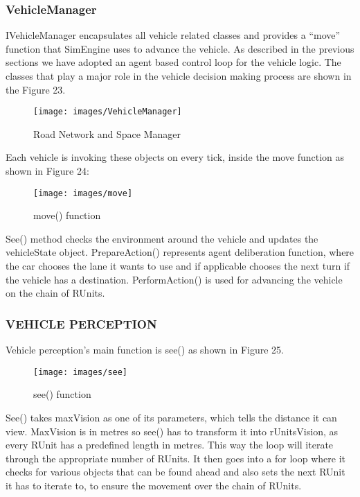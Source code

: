 \documentclass[11pt,a4paper]{article}
\begin{document}
  \subsubsection{VehicleManager}
  
  IVehicleManager encapsulates all vehicle related classes and provides a “move” function that SimEngine uses to advance the vehicle.
As described in the previous sections we have adopted an agent based control loop for the vehicle logic. The classes that play a major role in the vehicle decision making process are shown in the Figure 23. 
  \begin{figure}[h!]
			\texttt{[image: images/VehicleManager]}
			\caption{Road Network and Space Manager}
			\centering
		\end{figure} 
  Each vehicle is invoking these objects on every tick, inside the move function as shown in Figure 24:
  
   \begin{figure}[h!]
			\texttt{[image: images/move]}
			\caption{move() function}
			\centering
		\end{figure} 
	See() method checks the environment around the vehicle and updates the vehicleState object. PrepareAction() represents agent deliberation function, where the car chooses the lane it wants to use and if applicable chooses the next turn if the vehicle has a destination. PerformAction() is used for advancing the vehicle on the chain of RUnits.
  
  \subsubsection{VEHICLE PERCEPTION}
  
  Vehicle perception’s main function is see() as shown in Figure 25.
   \begin{figure}[h!]
			\texttt{[image: images/see]}
			\caption{see() function}
			\centering
		\end{figure} 
See() takes maxVision as one of its parameters, which tells the distance it can view. MaxVision is in metres so see() has to transform it into rUnitsVision, as every RUnit has a predefined length in metres. This way the loop will iterate through the appropriate number of RUnits.
It then goes into a for loop where it checks for various objects that can be found ahead and also sets the next RUnit it has to iterate to, to ensure the movement over the chain of RUnits.
\end{document}
